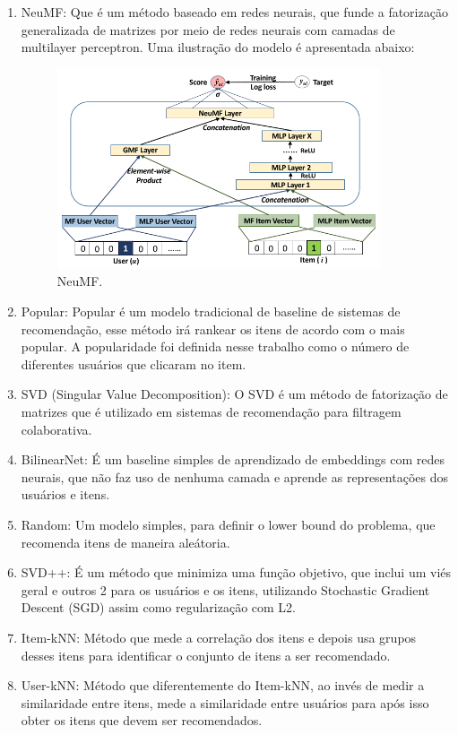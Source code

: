 \documentclass{article}
\begin{document}
\begin{enumerate}
  \item NeuMF: Que é um método baseado em redes neurais, que funde a fatorização generalizada de matrizes por meio de redes neurais com camadas de multilayer perceptron. Uma ilustração do modelo é apresentada abaixo:

\begin{figure}[h]
    \centering
    \includegraphics[width=0.90\textwidth]{neumf.png}
    \caption{NeuMF.}
  \label{fig:neumf}
\end{figure}

  \item Popular: Popular é um modelo tradicional de baseline de sistemas de recomendação, esse método irá rankear os itens de acordo com o mais popular. A popularidade foi definida nesse trabalho como o número de diferentes usuários que clicaram no item.
  \item SVD (Singular Value Decomposition): O SVD é um método de fatorização de matrizes que é utilizado em sistemas de recomendação para filtragem colaborativa. 
  \item BilinearNet: É um baseline simples de aprendizado de embeddings com redes neurais, que não faz uso de nenhuma camada e aprende as representações dos usuários e itens.
  \item Random: Um modelo simples, para definir o lower bound do problema, que recomenda itens de maneira aleátoria.
  \item SVD++: É um método que minimiza uma função objetivo, que inclui um viés geral e outros 2 para os usuários e os itens, utilizando Stochastic Gradient Descent (SGD) assim como regularização com L2.
  \item Item-kNN: Método que mede a correlação dos itens e depois usa grupos desses itens para identificar o conjunto de itens a ser recomendado.
  \item User-kNN: Método que diferentemente do Item-kNN, ao invés de medir a similaridade entre itens, mede a similaridade entre usuários para após isso obter os itens que devem ser recomendados.
\end{enumerate}
\end{document}

